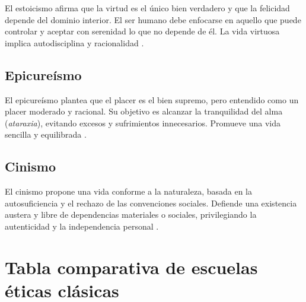 \documentclass[
	spanish, %
	letterpaper, oneside
]{article}
\begin{document}
El estoicismo afirma que la virtud es el único bien verdadero y que la felicidad depende del dominio interior. El ser humano debe enfocarse en aquello que puede controlar y aceptar con serenidad lo que no depende de él. La vida virtuosa implica autodisciplina y racionalidad \citep{huerta2000etica}.

\subsection*{Epicureísmo}

El epicureísmo plantea que el placer es el bien supremo, pero entendido como un placer moderado y racional. Su objetivo es alcanzar la tranquilidad del alma (\textit{ataraxia}), evitando excesos y sufrimientos innecesarios. Promueve una vida sencilla y equilibrada \citep{huerta2000etica}.

\subsection*{Cinismo}

El cinismo propone una vida conforme a la naturaleza, basada en la autosuficiencia y el rechazo de las convenciones sociales. Defiende una existencia austera y libre de dependencias materiales o sociales, privilegiando la autenticidad y la independencia personal \citep{huerta2000etica}.

\section{Tabla comparativa de escuelas éticas clásicas}


\end{document}
